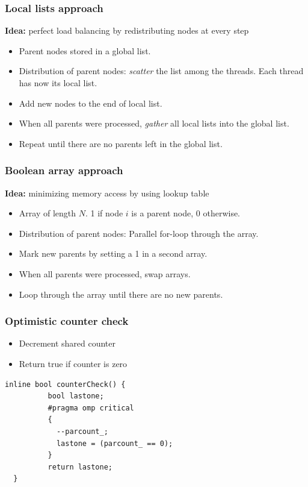 \begin{frame}
 \frametitle{Local lists approach}
 \textbf{Idea:} perfect load balancing by redistributing nodes at every step
  \begin{itemize}
  \item Parent nodes stored in a global list.
  \item Distribution of parent nodes: \emph{scatter} the list among the threads. Each thread has now its local list.
  \item Add new nodes to the end of local list.
  \item When all parents were processed, \emph{gather} all local lists into the global list.
  \item Repeat until there are no parents left in the global list.
  \end{itemize}
  
\end{frame}

\begin{frame}
 \frametitle{Boolean array approach}
 \textbf{Idea:} minimizing memory access by using lookup table 
 \begin{itemize}
  \item Array of length $N$. 1 if node $i$ is a parent node, 0 otherwise.
  \item Distribution of parent nodes: Parallel for-loop through the array.
  \item Mark new parents by setting a 1 in a second array.
  \item When all parents were processed, swap arrays.
  \item Loop through the array until there are no new parents.
 \end{itemize}
 
\end{frame}

\begin{frame}[fragile]
 \frametitle{Optimistic counter check}
 \begin{itemize}
  \item Decrement shared counter
  \item Return true if counter is zero
 \end{itemize}
 \begin{lstlisting}[style=cpp]
  inline bool counterCheck() {
          bool lastone;
          #pragma omp critical
          {
            --parcount_;
            lastone = (parcount_ == 0);
          }
          return lastone;
  }
 \end{lstlisting}
\end{frame}


